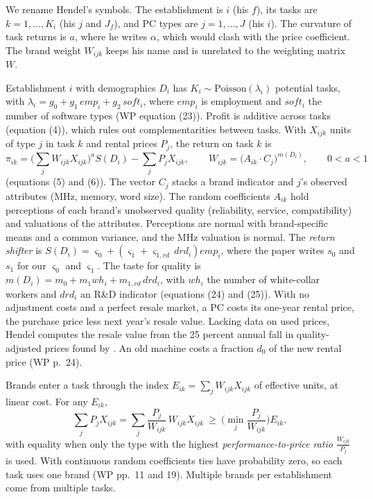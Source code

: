 We rename Hendel's symbols. The establishment is $i$ (his $f$), its tasks are $k = 1, \dots, K_i$ (his $j$ and
$J_f$), and PC types are $j = 1, \dots, J$ (his $i$). The curvature of task returns is $a$, where he writes $\alpha$,
which would clash with the price coefficient. The brand weight $W_{ijk}$ keeps his name and is unrelated to the weighting
matrix $W$.

Establishment $i$ with demographics $D_i$ has $K_i \sim \text{Poisson}(\lambda_i)$ potential tasks, with
$\lambda_i = g_0 + g_1\,emp_i + g_2\,soft_i$, where $emp_i$ is employment and $soft_i$ the number of software types
(WP equation (23)). Profit is additive across tasks (equation (4)), which rules out complementarities between
tasks. With $X_{ijk}$ units of type $j$ in task $k$ and rental prices $P_j$, the return on task $k$ is
\begin{equation}\label{eq:07-hendel-return}
\pi_{ik} = \Big(\sum_{j} W_{ijk}X_{ijk}\Big)^{a} S(D_i) - \sum_{j}P_jX_{ijk},
\qquad
W_{ijk} = \big(A_{ik}\cdot C_j\big)^{m(D_i)},
\qquad 0 < a < 1
\end{equation}
(equations (5) and (6)). The vector $C_j$ stacks a brand indicator and $j$'s observed attributes (MHz, memory, word
size). The random coefficients $A_{ik}$ hold perceptions of each brand's unobserved quality (reliability, service,
compatibility) and valuations of the attributes. Perceptions are normal with brand-specific means and a common
variance, and the MHz valuation is normal. The \emph{return shifter} is $S(D_i) = \varsigma_0 + (\varsigma_1 +
\varsigma_{1,rd}\,drd_i)emp_i$, where the paper writes $s_0$ and $s_1$ for our $\varsigma_0$ and $\varsigma_1$.
The taste for quality is $m(D_i) = m_0 + m_1 wh_i + m_{1,rd}\,drd_i$, with $wh_i$ the number of white-collar
workers and $drd_i$ an R\&D indicator (equations (24) and (25)). With no adjustment costs and a perfect resale market,
a PC costs its one-year rental price, the purchase price less next year's resale value. Lacking data on used prices,
Hendel computes the resale value from the 25 percent annual fall in quality-adjusted prices found by
\citet{BerndtGriliches1993}. An old machine costs a fraction $d_0$ of the new rental price (WP p.~24).

Brands enter a task through the index $E_{ik} = \sum_j W_{ijk}X_{ijk}$ of effective units, at linear cost. For any
$E_{ik}$,
\begin{equation*}
\sum_j P_jX_{ijk} = \sum_j \frac{P_j}{W_{ijk}}\,W_{ijk}X_{ijk} \ \ge\ \Big(\min_j\frac{P_j}{W_{ijk}}\Big)E_{ik},
\end{equation*}
with equality when only the type with the highest \emph{performance-to-price ratio} $\frac{W_{ijk}}{P_j}$ is used.
With continuous random coefficients ties have probability zero, so each task uses one brand (WP pp.~11 and 19).
Multiple brands per establishment come from multiple tasks.

